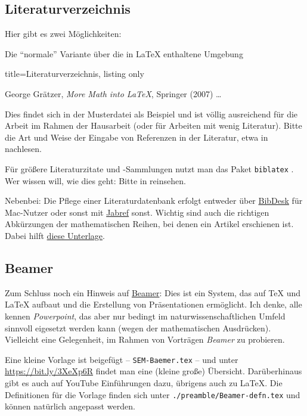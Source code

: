 \subsection{Literaturverzeichnis}
Hier gibt es zwei Möglichkeiten: 

\begin{myitemize}

\item 
Die \enquote{normale} Variante über die in \LaTeX{} enthaltene Umgebung 
%
\begin{tcblisting}{ title=Literaturverzeichnis, listing only}
\begin{thebibliography}{99}
%
 George Grätzer,  
\emph{More Math into \LaTeX{}}, Springer (2007)
\ldots
\end{thebibliography}
\end{tcblisting}
%
Dies findet sich in der Musterdatei als Beispiel und ist völlig ausreichend für die Arbeit im Rahmen der Hausarbeit (oder für Arbeiten mit wenig Literatur).
Bitte die Art und Weise der Eingabe von Referenzen in der Literatur, etwa in \textcite{voss:2012a} nachlesen.
	
	\item
	Für größere Literaturzitate und -Sammlungen nutzt man das Paket \texttt{biblatex}  \textcite{voss:2011}. 
	Wer wissen will, wie dies geht: Bitte in \textcite{latextipps6} reinsehen.	
\end{myitemize}
%
Nebenbei: Die Pflege einer Literaturdatenbank erfolgt entweder über \href{https://de.wikipedia.org/wiki/BibDesk}{BibDesk} für Mac-Nutzer oder sonst mit \href{https://de.wikipedia.org/wiki/JabRef}{Jabref} sonst.
Wichtig sind auch die richtigen Abkürzungen der mathematischen Reihen, bei denen ein Artikel erschienen ist.
Dabei hilft \href{https://images.webofknowledge.com/images/help/WOS/A_abrvjt.html}{diese Unterlage}.
%

\subsection{Beamer}
Zum Schluss noch ein Hinweis auf \href{https://de.wikipedia.org/wiki/Beamer_(LaTeX)}{Beamer}: Dies ist ein System, das auf \TeX{} und \LaTeX{} aufbaut und die Erstellung von Präsentationen ermöglicht.
Ich denke, alle kennen \emph{Powerpoint}, das aber nur bedingt im naturwissenschaftlichen Umfeld sinnvoll eigesetzt werden kann (wegen der mathematischen Ausdrücken).
Vielleicht eine Gelegenheit, im Rahmen von Vorträgen \emph{Beamer} zu probieren.

Eine kleine Vorlage ist beigefügt -- \texttt{SEM-Baemer.tex} -- und unter 
 \url{https://bit.ly/3XeXp6R} findet man eine (kleine große) Übersicht.
Darüberhinaus gibt es auch auf YouTube Einführungen dazu, übrigens auch zu \LaTeX{}.
Die Definitionen für die Vorlage finden sich unter \texttt{./preamble/Beamer-defn.tex} und können natürlich angepasst werden.
